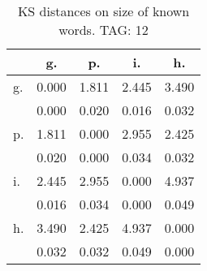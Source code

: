 \begin{table}[h!]
\begin{center}
\begin{tabular}{| l | c | c | c | c |}\hline
 & g. & p. & i. & h. \\\hline
g. & 0.000  & 1.811  & 2.445  & 3.490 \\\hline
 & 0.000  & 0.020  & 0.016  & 0.032 \\\hline
p. & 1.811  & 0.000  & 2.955  & 2.425 \\\hline
 & 0.020  & 0.000  & 0.034  & 0.032 \\\hline
i. & 2.445  & 2.955  & 0.000  & 4.937 \\\hline
 & 0.016  & 0.034  & 0.000  & 0.049 \\\hline
h. & 3.490  & 2.425  & 4.937  & 0.000 \\\hline
 & 0.032  & 0.032  & 0.049  & 0.000 \\\hline
\end{tabular}
\caption{KS distances on size of known words. TAG: 12}
\end{center}
\end{table}